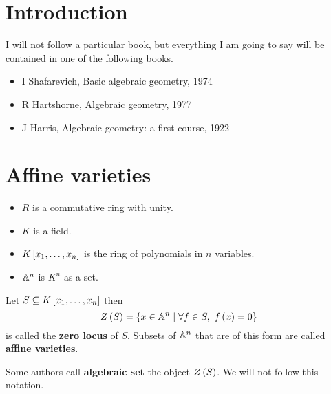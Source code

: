 \def\module{M4P33 Algebraic Geometry}
\def\lecturer{Dr Genival Da Silva Jr}
\def\term{Spring 2019}

\def\thm{section}







\section{Introduction}


I will not follow a particular book, but everything I am going to say will be contained in one of the following books.
\begin{itemize}
\item I Shafarevich, Basic algebraic geometry, 1974
\item R Hartshorne, Algebraic geometry, 1977
\item J Harris, Algebraic geometry: a first course, 1922
\end{itemize}

\pagebreak

\section{Affine varieties}

\begin{notation}
\hfill
\begin{itemize}
\item $ R $ is a commutative ring with unity.
\item $ K $ is a field.
\item $ K\sb{x_1, \dots, x_n} $ is the ring of polynomials in $ n $ variables.
\item $ \A^n $ is $ K^n $ as a set.
\end{itemize}
\end{notation}

\begin{definition}
Let $ S \subseteq K\sb{x_1, \dots, x_n} $ then
$$ Z\rb{S} = \cb{x \in \A^n \mid \forall f \in S, \ f\rb{x} = 0} $$
is called the \textbf{zero locus} of $ S $. Subsets of $ \A^n $ that are of this form are called \textbf{affine varieties}.
\end{definition}

\begin{remark}
Some authors call \textbf{algebraic set} the object $ Z\rb{S} $. We will not follow this notation.
\end{remark}

